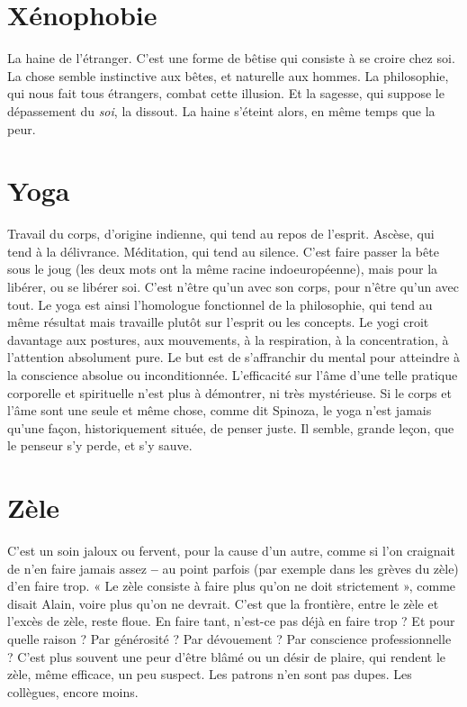 \section{Xénophobie}
La haine de l'étranger. C’est une forme de bêtise qui consiste
à se croire chez soi. La chose semble instinctive aux bêtes, et
naturelle aux hommes. La philosophie, qui nous fait tous étrangers, combat
cette illusion. Et la sagesse, qui suppose le dépassement du {\it soi}, la dissout. La
haine s’éteint alors, en même temps que la peur.

\section{Yoga}
Travail du corps, d’origine indienne, qui tend au repos de l'esprit.
Ascèse, qui tend à la délivrance. Méditation, qui tend au silence.
C’est faire passer la bête sous le joug (les deux mots ont la même racine indoeuropéenne),
mais pour la libérer, ou se libérer soi. C’est n’être qu’un avec son
corps, pour n'être qu’un avec tout. Le yoga est ainsi l’homologue fonctionnel de
la philosophie, qui tend au même résultat mais travaille plutôt sur l'esprit ou les
concepts. Le yogi croit davantage aux postures, aux mouvements, à la respiration,
à la concentration, à l'attention absolument pure. Le but est de s’affranchir du
mental pour atteindre à la conscience absolue ou inconditionnée. L'efficacité sur
l’âme d’une telle pratique corporelle et spirituelle n’est plus à démontrer, ni très
mystérieuse. Si le corps et l’âme sont une seule et même chose, comme dit Spinoza,
le yoga n’est jamais qu’une façon, historiquement située, de penser juste. Il
semble, grande leçon, que le penseur s’y perde, et s’y sauve.

\section{Zèle}
C’est un soin jaloux ou fervent, pour la cause d’un autre, comme si
l’on craignait de n’en faire jamais assez {\bf --} au point parfois (par exemple
dans les grèves du zèle) d’en faire trop. « Le zèle consiste à faire plus qu’on ne
doit strictement », comme disait Alain, voire plus qu’on ne devrait. C’est que
la frontière, entre le zèle et l’excès de zèle, reste floue. En faire tant, n’est-ce pas
déjà en faire trop ? Et pour quelle raison ? Par générosité ? Par dévouement ?
Par conscience professionnelle ? C’est plus souvent une peur d’être blâmé ou
un désir de plaire, qui rendent le zèle, même efficace, un peu suspect. Les
patrons n’en sont pas dupes. Les collègues, encore moins.


